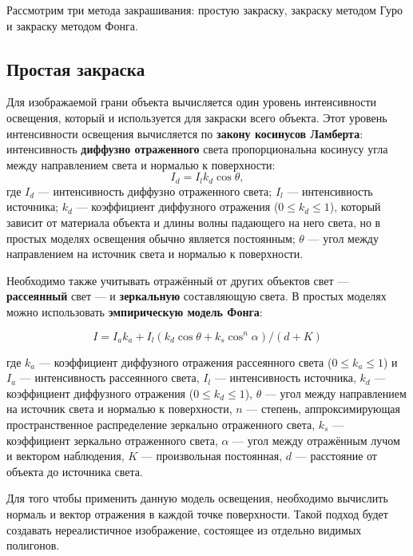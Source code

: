 \begin{enumerate}
Рассмотрим три метода закрашивания: простую закраску, закраску методом Гуро и закраску методом Фонга.

\subsection{Простая закраска}

Для изображаемой грани объекта вычисляется один уровень интенсивности освещения, который и используется для закраски всего объекта. Этот уровень интенсивности освещения вычисляется по \textbf{закону косинусов Ламберта}: интенсивность \textbf{диффузно отраженного} света пропорциональна косинусу угла между направлением света и нормалью к поверхности: 
\begin{equation}
I_d = I_l k_d \cos \theta,
\end{equation}
где $I_d$ --- интенсивность диффузно отраженного света;
$I_l$ --- интенсивность источника;
$k_d$ --- коэффициент диффузного отражения ($0  \leq k_d  \leq 1$), который зависит от материала объекта и длины волны падающего на него света, но в простых моделях освещения обычно является постоянным;
$\theta$ --- угол между направлением на источник света и нормалью к поверхности.

Необходимо также учитывать отражённый от других объектов свет --- \textbf{рассеянный} свет --- и \textbf{зеркальную} составляющую света. В простых моделях можно использовать \textbf{эмпирическую модель Фонга}:

\begin{equation}
	I =  I_a k_a + I_l (k_d \cos \theta + k_s \cos ^n\alpha ) / (d + K)
\end{equation}

где $k_a$ --- коэффициент диффузного отражения рассеянного света ($0  \leq k_a  \leq 1$) и $I_a$ --- интенсивность рассеянного света, $I_l$ --- интенсивность источника, $k_d$ --- коэффициент диффузного отражения ($0  \leq k_d  \leq 1$), $\theta$ --- угол между направлением на источник света и нормалью к поверхности, $n$ --- степень, аппроксимирующая пространственное распределение зеркально отраженного света, $k_s$ --- коэффициент зеркально отраженного света, $\alpha$ --- угол между отражённым лучом и вектором наблюдения, $K$ --- произвольная постоянная, $d$ --- расстояние от объекта до источника света.

Для того чтобы применить данную модель освещения, необходимо вычислить нормаль и вектор отражения в каждой точке поверхности. Такой подход будет создавать нереалистичное изображение, состоящее из отдельно видимых полигонов.


\end{enumerate}
